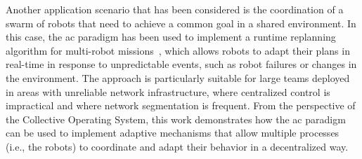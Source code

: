 \documentclass[runningheads]{llncs}
\begin{document}
    Another application scenario that has been considered is the coordination of a swarm of robots that need to achieve a common goal in a shared environment.
    In this case,
    the \ac{ac} paradigm has been used to implement a runtime replanning algorithm for multi-robot missions~\cite{DBLP:conf/acsos/AguzziBCMPPV25},
    which allows robots to adapt their plans in real-time in response to unpredictable events, such as
    robot failures or changes in the environment.
    The approach is particularly suitable for large teams deployed in areas with unreliable network infrastructure,
    where centralized control is impractical and where network segmentation is frequent.
    From the perspective of the Collective Operating System,
    this work demonstrates how the \ac{ac} paradigm can be used to implement adaptive mechanisms
    that allow multiple processes (i.e., the robots) to coordinate and adapt their behavior in a decentralized way.
\end{document}
